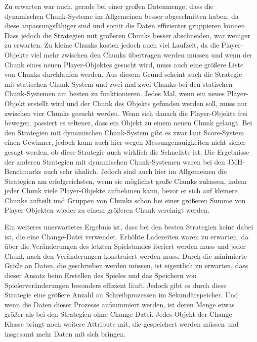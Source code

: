 Zu erwarten war auch, gerade bei einer großen Datenmenge, dass die dynamischen Chunk-Systeme im Allgemeinen besser abgeschnitten haben, da diese anpassungsfähiger sind und somit die Daten effizienter gruppieren können. Dass jedoch die Strategien mit größeren Chunks besser abschneiden, war weniger zu erwarten. Zu kleine Chunks kosten jedoch auch viel Laufzeit, da die Player-Objekte viel mehr zwischen den Chunks übertragen werden müssen und wenn der Chunk eines neuen Player-Objektes gesucht wird, muss auch eine größere Liste von Chunks durchlaufen werden. Aus diesem Grund scheint auch die Strategie mit statischen Chunk-System und zwei mal zwei Chunks bei den statischen Chunk-Systemen am besten zu funktionieren. Jedes Mal, wenn ein neues Player-Objekt erstellt wird und der Chunk des Objekts gefunden werden soll, muss nur zwischen vier Chunks gesucht werden. Wenn sich danach die Player-Objekte frei bewegen, passiert es seltener, dass ein Objekt zu einem neuen Chunk gelangt. Bei den Strategien mit dynamischen Chunk-System gibt es zwar laut Score-System einen Gewinner, jedoch kann auch hier wegen Messungenauigkeiten nicht sicher gesagt werden, ob diese Strategie auch wirklich die Schnellste ist. Die Ergebnisse der anderen Strategien mit dynamischen Chunk-Systemen waren bei den JMH-Benchmarks auch sehr ähnlich. Jedoch sind auch hier im Allgemeinen die Strategien am erfolgreichsten, wenn sie möglichst große Chunks zulassen, indem jeder Chunk viele Player-Objekte aufnehmen kann, bevor er sich auf kleinere Chunks aufteilt und Gruppen von Chunks schon bei einer größeren Summe von Player-Objekten wieder zu einem größeren Chunk vereinigt werden.

Ein weiteres unerwartetes Ergebnis ist, dass bei den besten Strategien keine dabei ist, die eine Change-Datei verwendet. Erhöhte Ladezeiten waren zu erwarten, da über die Veränderungen des letzten Spielstandes iteriert werden muss und jeder Chunk nach den Veränderungen konstruiert werden muss. Durch die minimierte Größe an Daten, die geschrieben werden müssen, ist eigentlich zu erwarten, dass dieser Ansatz beim Erstellen des Spieles und das Speichern von Spielerveränderungen besonders effizient läuft. Jedoch gibt es durch diese Strategie eine größere Anzahl an Schreibprozessen im Sekundärspeicher. Und wenn die Daten dieser Prozesse aufsummiert werden, ist deren Menge etwas größer als bei den Strategien ohne Change-Datei. Jedes Objekt der Change-Klasse bringt noch weitere Attribute mit, die gespeichert werden müssen und insgesamt mehr Daten mit sich bringen.

